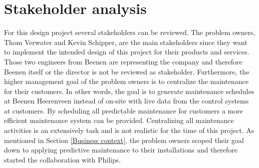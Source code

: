 \section{Stakeholder analysis} \label{Stakeholder analysis}
For this design project several stakeholders can be reviewed. The problem owners, Thom Verwater and Kevin Schipper, are the main stakeholders since they want to implement the intended design of this project for their products and services. Those two engineers from Beenen are representing the company and therefore Beenen itself or the director is not be reviewed as stakeholder. Furthermore, the higher management goal of the problem owners is to centralize the maintenance for their customers. In other words, the goal is to generate maintenance schedules at Beenen Heerenveen instead of on-site with live data from the control systems at customers. By scheduling all predictable maintenance for customers a more efficient maintenance system can be provided. Centralizing all maintenance activities is an extensively task and is not realistic for the time of this project. As mentioned in Section \ref{Business context}, the problem owners scoped their goal down to applying predictive maintenance to their installations and therefore started the collaboration with Philips.

